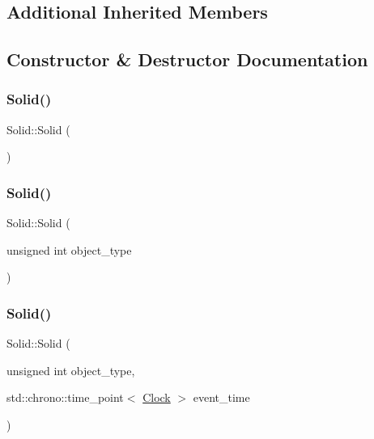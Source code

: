 \subsection*{Additional Inherited Members}


\subsection{Constructor \& Destructor Documentation}
\mbox{\label{classSolid_a2cf157c87df66dc3eb8722f9b3ee8f66}} 
\subsubsection{\texorpdfstring{Solid()}{Solid()}\hspace{0.1cm}{\footnotesize\ttfamily [1/4]}}
{\footnotesize\ttfamily Solid\+::\+Solid (\begin{DoxyParamCaption}{ }\end{DoxyParamCaption})\hspace{0.3cm}{\ttfamily [inline]}}

\mbox{\label{classSolid_a00a71dfc929ca50ee9850bdfca5b3fd6}} 
\subsubsection{\texorpdfstring{Solid()}{Solid()}\hspace{0.1cm}{\footnotesize\ttfamily [2/4]}}
{\footnotesize\ttfamily Solid\+::\+Solid (\begin{DoxyParamCaption}\item[{unsigned int}]{object\+\_\+type }\end{DoxyParamCaption})\hspace{0.3cm}{\ttfamily [inline]}}

\mbox{\label{classSolid_a9f5476b751c749af38b349b9fc7e2ba5}} 
\subsubsection{\texorpdfstring{Solid()}{Solid()}\hspace{0.1cm}{\footnotesize\ttfamily [3/4]}}
{\footnotesize\ttfamily Solid\+::\+Solid (\begin{DoxyParamCaption}\item[{unsigned int}]{object\+\_\+type,  }\item[{std\+::chrono\+::time\+\_\+point$<$ \mbox{\hyperlink{universe_8h_a0ef8d951d1ca5ab3cfaf7ab4c7a6fd80}{Clock}} $>$}]{event\+\_\+time }\end{DoxyParamCaption})\hspace{0.3cm}{\ttfamily [inline]}}

